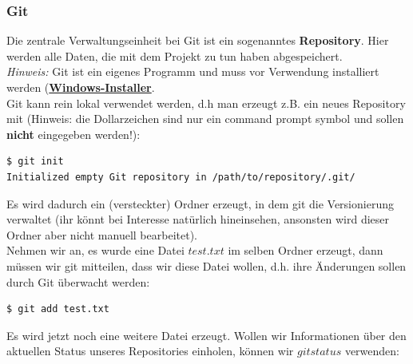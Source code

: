 \documentclass{article}
\begin{document}
\subsubsection{Git}
Die zentrale Verwaltungseinheit bei Git ist ein sogenanntes \textbf{Repository}. Hier werden alle Daten, die mit dem Projekt zu tun haben abgespeichert. \\
\textit{Hinweis:} Git ist ein eigenes Programm und muss vor Verwendung installiert werden (\textbf{\href{https://git-scm.com/download/win}{Windows-Installer}}.  \\
Git kann rein lokal verwendet werden, d.h man erzeugt z.B. ein neues Repository mit (Hinweis: die Dollarzeichen sind nur ein command prompt symbol und sollen \textbf{nicht} eingegeben werden!): 
\begin{verbatim}
$ git init
Initialized empty Git repository in /path/to/repository/.git/
\end{verbatim}
Es wird dadurch ein (versteckter) Ordner erzeugt, in dem git die Versionierung verwaltet (ihr könnt bei Interesse natürlich hineinsehen, ansonsten wird dieser Ordner aber nicht manuell bearbeitet). \\
Nehmen wir an, es wurde eine Datei $test.txt$ im selben Ordner erzeugt, dann müssen wir git mitteilen, dass wir diese Datei  wollen, d.h. ihre Änderungen sollen durch Git überwacht werden: 
\begin{verbatim}
$ git add test.txt
\end{verbatim}
Es wird jetzt noch eine weitere Datei  erzeugt. Wollen wir Informationen über den aktuellen Status unseres Repositories einholen, können wir $git status$ verwenden:
\end{document}
